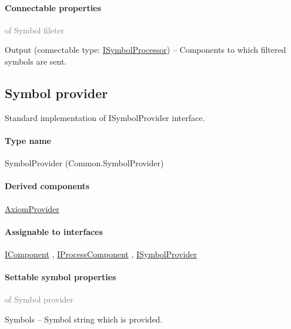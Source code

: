 	\paragraph{Connectable properties}\textcolor{gray}{of Symbol fileter}
	\begin{description*}
		\item[Output]
		(connectable type:  \hyperref[Malsys.Processing.Components.ISymbolProcessor]{ISymbolProcessor})
			-- Components to which filtered symbols are sent.
	\end{description*}
	


\subsection{Symbol provider}
\label{Malsys.Processing.Components.Common.SymbolProvider}
Standard implementation of ISymbolProvider interface.\paragraph{Type name}
SymbolProvider (Common.SymbolProvider) 	\paragraph{Derived components}
		\hyperref[Malsys.Processing.Components.Common.AxiomProvider]{AxiomProvider}%
	\paragraph{Assignable to interfaces}
		\hyperref[Malsys.Processing.Components.IComponent]{IComponent}%
, 		\hyperref[Malsys.Processing.Components.IProcessComponent]{IProcessComponent}%
, 		\hyperref[Malsys.Processing.Components.ISymbolProvider]{ISymbolProvider}%
	\paragraph{Settable symbol properties}\textcolor{gray}{of Symbol provider}
	\begin{description*}
		\item[Symbols]
			-- Symbol string which is provided.
	\end{description*}
	


